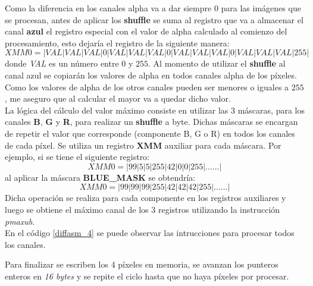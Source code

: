 Como la diferencia en los canales alpha va a dar siempre $0$ para las im\'agenes que se procesan, antes de aplicar los \textbf{shuffle} se suma al registro que va a almacenar el canal \textbf{azul} el registro especial con el valor de alpha calculado al comienzo del procesamiento, esto dejaría el registro de la siguiente manera:
$$ XMM0 = |VAL|VAL|VAL|0|VAL|VAL|VAL|0|VAL|VAL|VAL|0|VAL|VAL|VAL|255| $$
donde \emph{VAL} es un n\'umero entre $0$ y $255$. Al momento de utilizar el \textbf{shuffle} al canal azul se copiar\'an los valores de alpha en todos canales alpha de los p\'ixeles. Como los valores de alpha de los otros canales pueden ser menores o iguales a $255$, me aseguro que al calcular el mayor va a quedar dicho valor. \\
La l\'ogica del c\'alculo del valor m\'aximo consiste en utilizar las 3 m\'ascaras, para los canales \textbf{B}, \textbf{G} y \textbf{R}, para realizar un \textbf{shuffle} a byte. Dichas m\'ascaras se encargan de repetir el valor que corresponde (componente B, G o R) en todos los canales de cada p\'ixel. Se utiliza un registro \textbf{XMM} auxiliar para cada m\'ascara. Por ejemplo, si se tiene el siguiente registro:
$$ XMM0 = |99|5|5|255|42|0|0|255|......| $$
al aplicar la m\'ascara \textbf{BLUE\_MASK} se obtendr\'ia: \\
$$ XMM0 = |99|99|99|255|42|42|42|255|......| $$
Dicha operaci\'on se realiza para cada componente en los registros auxiliares y luego se obtiene el m\'aximo canal de los 3 registros utilizando la instrucci\'on \emph{pmaxub}. \\
En  el c\'odigo \ref{diffasm_4} se puede observar las intrucciones para procesar todos los canales.

Para finalizar se escriben los 4 p\'ixeles en memoria, se avanzan los punteros enteros en \emph{16 bytes} y se repite el ciclo hasta que no haya p\'ixeles por procesar.


